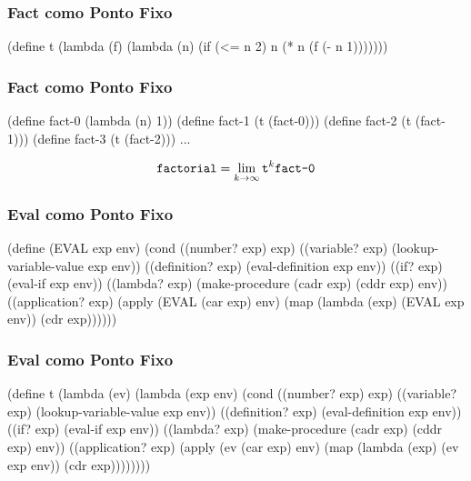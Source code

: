 \begin{frame}[fragile]
  \frametitle{Fact como Ponto Fixo}
  \begin{code}
  (define t
    (lambda (f)
      (lambda (n)
        (if (<= n 2)
            n
            (* n (f (- n 1)))))))
  \end{code}
\end{frame}

\begin{frame}[fragile]
  \frametitle{Fact como Ponto Fixo}
  \begin{code}
  (define fact-0 (lambda (n) 1))
  (define fact-1 (t (fact-0)))
  (define fact-2 (t (fact-1)))
  (define fact-3 (t (fact-2)))
  ...
  \end{code}

  \pause

  \[\texttt{factorial} = \lim_{k \to \infty} \texttt{t}^k \texttt{fact-0}\]
\end{frame}

\begin{frame}[fragile]
  \frametitle{Eval como Ponto Fixo}
  \begin{code}
(define (EVAL exp env)
  (cond
    ((number? exp)      exp)
    ((variable? exp)    (lookup-variable-value exp env))
    ((definition? exp)  (eval-definition exp env))
    ((if? exp)          (eval-if exp env))
    ((lambda? exp)      (make-procedure (cadr exp)
                                        (cddr exp) env))
    ((application? exp) (apply (EVAL (car exp) env)
                               (map (lambda (exp)
                                            (EVAL exp env))
                                    (cdr exp))))))
  \end{code}
\end{frame}

\begin{frame}[fragile]
  \frametitle{Eval como Ponto Fixo}
  \begin{code}
(define t (lambda (ev) (lambda (exp env)
  (cond
    ((number? exp)      exp)
    ((variable? exp)    (lookup-variable-value exp env))
    ((definition? exp)  (eval-definition exp env))
    ((if? exp)          (eval-if exp env))
    ((lambda? exp)      (make-procedure (cadr exp)
                                        (cddr exp) env))
    ((application? exp) (apply (ev (car exp) env)
                               (map (lambda (exp)
                                            (ev exp env))
                                    (cdr exp))))))))
  \end{code}
\end{frame}


